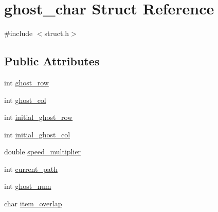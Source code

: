 \hypertarget{structghost__char}{\section{ghost\-\_\-char Struct Reference}
\label{structghost__char}
}


{\ttfamily \#include $<$struct.\-h$>$}

\subsection*{Public Attributes}
\begin{DoxyCompactItemize}
\item 
int \hyperlink{structghost__char_a67b5a2bb2bc525a5365def8a6e9155c2}{ghost\-\_\-row}
\item 
int \hyperlink{structghost__char_a1959b023b6c10f239cb453c39d5cae0b}{ghost\-\_\-col}
\item 
int \hyperlink{structghost__char_a734ad05eb363be665d643e4ad2c5d260}{initial\-\_\-ghost\-\_\-row}
\item 
int \hyperlink{structghost__char_aba22e39b4122f17f58cef5e63b0a86e6}{initial\-\_\-ghost\-\_\-col}
\item 
double \hyperlink{structghost__char_a6029da7c0e90ee9fdd44e8387df962a3}{speed\-\_\-multiplier}
\item 
int \hyperlink{structghost__char_a23a6fb0e6471ea915f78e041db08fbbf}{current\-\_\-path}
\item 
int \hyperlink{structghost__char_ad155619fd453f1363561112c4c6d07b1}{ghost\-\_\-num}
\item 
char \hyperlink{structghost__char_adda1e7c697556e2fb2a221a0a979af1a}{item\-\_\-overlap}
\end{DoxyCompactItemize}


